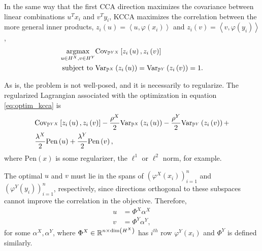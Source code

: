 \documentclass[14pt]{extarticle}
\begin{document}
In the same way that the first CCA direction maximizes the covariance between
linear combinations $u^{T}x_{i}$ and $v^{T}y_{i}$, KCCA maximizes the
correlation between the more general inner products, $z_{i}\left(u\right) =
\left<u, \varphi\left(x_{i}\right)\right>$ and $z_{i}\left(v\right) = \left<v,
\varphi\left(y_{i}\right)\right>$,
\begin{align}
  \mathop\mathrm{arg max}_{u \in H^{X}, v \in H^{Y}}
  &\mathrm{Cov}_{\mathbb{P}^{YX}}\left[{z_{i}\left(u\right), z_{i}\left(v\right)}\right] \label{eq:optim_kcca}\\
\text{subject to } &\mathrm{Var}_{\mathbb{P}^{X}}\left(z_{i}\left(u\right)\right) = \mathrm{Var}_{\mathbb{P}^{Y}}\left(z_{i}\left(v\right)\right) = 1. \nonumber
\end{align}

As is, the problem is not well-posed, and it is necessarily to regularize. The
regularized Lagrangian associated with the optimization in equation
\ref{eq:optim_kcca} is
\begin{align}
  &\mathrm{Cov}_{\mathbb{P}^{YX}}\left[{z_{i}\left(u\right), z_{i}\left(v\right)}\right] -
  \frac{\rho^{X}}{2}\mathrm{Var}_{\mathbb{P}^{X}}\left(z_{i}\left(u\right)\right) -
  \frac{\rho^{Y}}{2}\mathrm{Var}_{\mathbb{P}^{Y}}\left(z_{i}\left(v\right)\right) + \label{eq:lagrangian_kcca}\\
  &\frac{\lambda^{X}}{2}\text{Pen}\left(u\right) + \frac{\lambda^{Y}}{2}\text{Pen}\left(v\right), \nonumber
\end{align}
where $\text{Pen}\left(x\right)$ is some regularizer, the $\ell^{1}$ or
$\ell^{2}$ norm, for example.

The optimal $u$ and $v$ must lie in the spans of
$\left(\varphi^{X}\left(x_{i}\right)\right)_{i =1 }^{n}$ and
$\left(\varphi^{Y}\left(y_{i}\right)\right)_{i =1 }^{n}$, respectively, since
directions orthogonal to these subspaces cannot improve the correlation in the
objective. Therefore,
\begin{align*}
u &= \Phi^{X} \alpha^{X} \\
v &= \Phi^{Y} \alpha^{Y},
\end{align*}
for some $\alpha^{X}, \alpha^{Y}$, where $\Phi^{X} \in \mathbb{R}^{n \times
  \text{dim}\left(H^{X}\right)}$ has $i^{th}$ row
$\varphi^{Y}\left(x_{i}\right)$ and $\Phi^{Y}$ is defined similarly.
\end{document}
